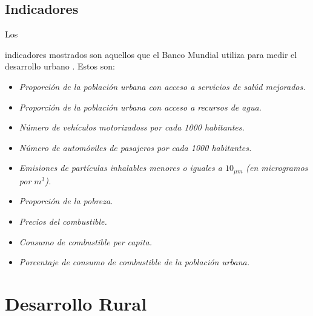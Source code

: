 \documentclass[stu, 12pt, letterpaper, donotrepeattitle, floatsintext, natbib]{apa7}
\begin{document}
\subsection{Indicadores}
Los \begin{justifying}
    indicadores mostrados son aquellos que el Banco Mundial utiliza para medir el desarrollo urbano \citep{mavric-2015}. %
    Estos son:
    \begin{itemize}
        \item \emph{Proporción de la población urbana con acceso a servicios de salúd mejorados.}
        \item \emph{Proporción de la población urbana con acceso a recursos de agua.}
        \item \emph{Número de vehículos motorizadoss por cada 1000 habitantes.}
        \item \emph{Número de automóviles de pasajeros por cada 1000 habitantes.}
        \item \emph{Emisiones de partículas inhalables menores o iguales a \(10_{\mu m}\) (en microgramos por \(m^3\)).}
        \item \emph{Proporción de la pobreza.}
        \item \emph{Precios del combustible.}
        \item \emph{Consumo de combustible per capita.}
        \item \emph{Porcentaje de consumo de combustible de la población urbana.}
    \end{itemize}\par
\end{justifying}
\vspace{\baselineskip}
\section{Desarrollo Rural}
\end{document}
